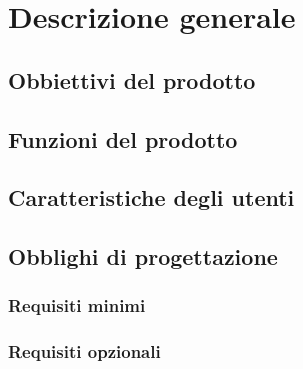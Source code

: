 \documentclass[AnalisiDeiRequisiti.tex]{subfiles}
\begin{document}
\chapter{Descrizione generale}
\section{Obbiettivi del prodotto}

\section{Funzioni del prodotto}

\section{Caratteristiche degli utenti}

\section{Obblighi di progettazione}
\subsection{Requisiti minimi}

\subsection{Requisiti opzionali}
\end{document}
